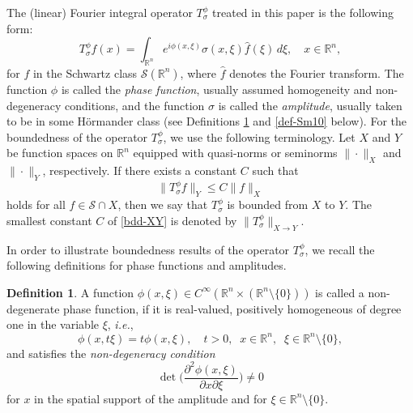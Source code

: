 \documentclass[12pt]{amsart}
\numberwithin{equation}{section}
\theoremstyle{plain}
\theoremstyle{definition}
\newtheorem{defn}[thm]{Definition}
\newcommand{\R}{\mathbb{R}}
\newcommand{\calS}{\mathcal{S}}
\begin{document}
The (linear) Fourier integral operator $T_{\sigma}^{\phi}$ 
treated in this paper
is the following form:
\begin{equation*} 
T_{\sigma}^{\phi} f (x)
= \int_{\R^n} e^{i \phi(x, \xi)} 
\sigma(x, \xi) \widehat{f} (\xi) \,d\xi ,
\quad x \in \R^n,
\end{equation*}
for
$f$ in the Schwartz class $\calS(\R^n)$,
where $\widehat{f}$ denotes the Fourier transform.
The function $\phi$ is called the {\it phase function},
usually assumed homogeneity and non-degeneracy conditions,
and the function $\sigma$ is called the {\it amplitude},
usually taken to be in some H\"ormander class
(see Definitions \ref{def-ND} and \ref{def-Sm10} below).
For the boundedness 
of the operator $T_{\sigma}^{\phi}$, 
we use the following terminology. 
Let $X$ and $Y$ be function spaces on $\R^n$ 
equipped with quasi-norms or seminorms 
$\|\cdot\|_{X}$ and $\|\cdot\|_{Y}$, respectively.
If there exists a constant $C$ such that
\begin{equation}\label{bdd-XY}
\|T_{\sigma}^{\phi} f\|_{Y}
\le C \|f\|_{X} 
\end{equation}
holds for all 
$f \in \calS \cap X$, 
then we say that 
$T_{\sigma}^{\phi}$ is bounded from 
$X$ to $Y$. 
The smallest constant $C$ of 
\eqref{bdd-XY} 
is denoted by 
$\|T_{\sigma}^{\phi}\|_{X \to Y}$. 


In order to illustrate boundedness results
of the operator $T_{\sigma}^{\phi}$,
we recall the following definitions 
for phase functions and amplitudes.

\begin{defn} \label{def-ND} 
A function 
$\phi (x,\xi) \in C^{\infty} (\R^{n} \times (\R^{n} \setminus \{0\}))$ 
is called a non-degenerate phase function,
if it is real-valued,
positively homogeneous of degree one 
in the variable $\xi$, {\it i.e.},
\[
\phi (x, t \xi) = t \phi (x,\xi), 
\quad
t > 0, 
\;\; x \in \R^n , 
\;\; \xi \in \R^n \setminus\{0\} ,
\]
and satisfies the {\it non-degeneracy condition}
\[
\det \Big( \frac{\partial^2 \phi (x,\xi)}{\partial{x} \partial{\xi}} \Big) \neq 0
\]
for $x$ in the spatial support of the amplitude and 
for $\xi \in \R^n \setminus\{0\}$.
\end{defn}
\end{document}
